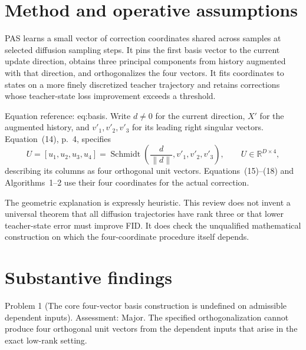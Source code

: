 \documentclass[10pt]{article}
\begin{document}
\section*{Method and operative assumptions}
PAS learns a small vector of correction coordinates shared across samples at selected diffusion sampling steps. It pins the first basis vector to the current update direction, obtains three principal components from history augmented with that direction, and orthogonalizes the four vectors. It fits coordinates to states on a more finely discretized teacher trajectory and retains corrections whose teacher-state loss improvement exceeds a threshold.\par
Equation reference: eq:basis. Write \(d\ne0\) for the current direction, \(X'\) for the augmented history, and \(v'_1,v'_2,v'_3\) for its leading right singular vectors. Equation (14), p. 4, specifies \[
 U=[u_1,u_2,u_3,u_4]
 =\operatorname{Schmidt}\left(
      \frac d{\|d\|},v'_1,v'_2,v'_3\right),
 \qquad U\in\mathbb R^{D\times4},\] describing its columns as four orthogonal unit vectors. Equations (15)–(18) and Algorithms 1–2 use their four coordinates for the actual correction.\par
The geometric explanation is expressly heuristic. This review does not invent a universal theorem that all diffusion trajectories have rank three or that lower teacher-state error must improve FID. It does check the unqualified mathematical construction on which the four-coordinate procedure itself depends.\par
\section*{Substantive findings}
Problem 1 (The core four-vector basis construction is undefined on admissible dependent inputs).  Assessment: Major. The specified orthogonalization cannot produce four orthogonal unit vectors from the dependent inputs that arise in the exact low-rank setting.\par
\end{document}
